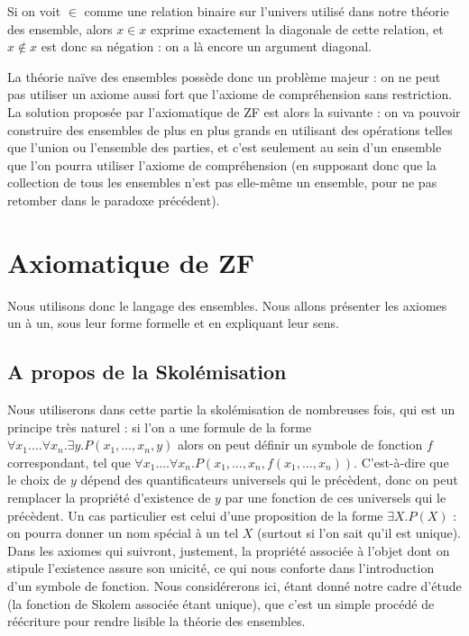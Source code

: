 \begin{rmk}
    Si on voit $\in$ comme une relation binaire sur l'univers utilisé dans notre théorie des ensemble, alors $x\in x$ exprime exactement la diagonale de cette relation, et $x\notin x$ est donc sa négation : on a là encore un argument diagonal.
\end{rmk}

La théorie naïve des ensembles possède donc un problème majeur : on ne peut pas utiliser un axiome aussi fort que l'axiome de compréhension sans restriction. La solution proposée par l'axiomatique de ZF est alors la suivante : on va pouvoir construire des ensembles de plus en plus grands en utilisant des opérations telles que l'union ou l'ensemble des parties, et c'est seulement au sein d'un ensemble que l'on pourra utiliser l'axiome de compréhension (en supposant donc que la collection de tous les ensembles n'est pas elle-même un ensemble, pour ne pas retomber dans le paradoxe précédent).

\section{Axiomatique de ZF}

Nous utilisons donc le langage des ensembles. Nous allons présenter les axiomes un à un, sous leur forme formelle et en expliquant leur sens.

\subsection{A propos de la Skolémisation}

Nous utiliserons dans cette partie la skolémisation de nombreuses fois, qui est un principe très naturel : si l'on a une formule de la forme $\forall x_1.\ldots\forall x_n.\exists y. P(x_1,\ldots,x_n,y)$ alors on peut définir un symbole de fonction $f$ correspondant, tel que $\forall x_1.\ldots\forall x_n.P(x_1,\ldots,x_n,f(x_1,\ldots,x_n))$. C'est-à-dire que le choix de $y$ dépend des quantificateurs universels qui le précèdent, donc on peut remplacer la propriété d'existence de $y$ par une fonction de ces universels qui le précèdent. Un cas particulier est celui d'une proposition de la forme $\exists X.P(X)$ : on pourra donner un nom spécial à un tel $X$ (surtout si l'on sait qu'il est unique). Dans les axiomes qui suivront, justement, la propriété associée à l'objet dont on stipule l'existence assure son unicité, ce qui nous conforte dans l'introduction d'un symbole de fonction. Nous considérerons ici, étant donné notre cadre d'étude (la fonction de Skolem associée étant unique), que c'est un simple procédé de réécriture pour rendre lisible la théorie des ensembles.


